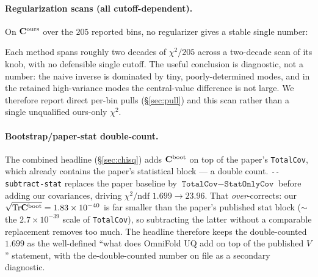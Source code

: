 \paragraph{Regularization scans (all cutoff-dependent).}
On $\mathbf{C}^{\text{ours}}$ over the $205$ reported bins, no regularizer
gives a stable single number:
\begin{center}
\end{center}
Each method spans roughly two decades of $\chi^{2}/205$ across a
two-decade scan of its knob, with no defensible single cutoff. The
useful conclusion is diagnostic, not a number: the naive inverse is
dominated by tiny, poorly-determined modes, and in the retained
high-variance modes the central-value difference is not large.
We therefore report direct per-bin pulls (\S\ref{sec:pull}) and this scan
rather than a single unqualified ours-only $\chi^{2}$.

\paragraph{Bootstrap/paper-stat double-count.}
The combined headline (\S\ref{sec:chisq}) adds $\mathbf{C}^{\text{boot}}$ on
top of the paper's \texttt{TotalCov}, which already contains the
paper's statistical block --- a double count.
\texttt{-{}-subtract-stat} replaces the paper baseline by
$\texttt{TotalCov}-\texttt{StatOnlyCov}$ before adding our covariances,
driving $\chi^{2}/\mathrm{ndf}$ $1.699\to 23.96$. That \emph{over}-corrects:
our $\sqrt{\mathrm{Tr}\mathbf{C}^{\text{boot}}}=1.83\times10^{-40}$ is far smaller
than the paper's published stat block ($\sim$ the $2.7\times10^{-39}$
scale of \texttt{TotalCov}), so subtracting the latter without a
comparable replacement removes too much. The headline therefore keeps
the double-counted $1.699$ as the well-defined ``what does OmniFold UQ
add on top of the published $V$'' statement, with the de-double-counted
number on file as a secondary diagnostic.


